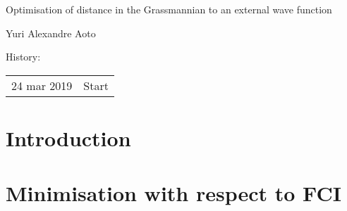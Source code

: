 \documentclass[a4paper,11pt]{article}
\begin{document}
\begin{center}
  {\LARGE Optimisation of distance in the Grassmannian to an external wave function}\vspace{1.0cm}

  {\Large Yuri Alexandre Aoto}
\end{center}
{History:
  
  \begin{tabular}{l@{ - }l}
    24 mar 2019 & Start\\
  \end{tabular}
}\vspace{3cm}


\section{Introduction}


\section{Minimisation with respect to FCI}


\end{document}
